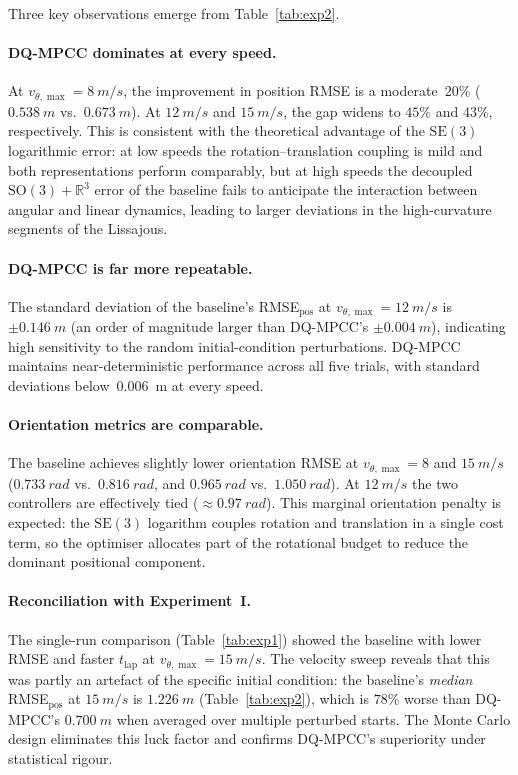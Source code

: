 Three key observations emerge from Table~\ref{tab:exp2}.

\paragraph{DQ-MPCC dominates at every speed.}
At $v_{\theta,\max} = \SI{8}{m/s}$, the improvement in position
RMSE is a moderate~$20\%$ ($\SI{0.538}{m}$ vs.\ $\SI{0.673}{m}$).
At $\SI{12}{m/s}$ and $\SI{15}{m/s}$, the gap widens to
$45\%$ and $43\%$, respectively.
This is consistent with the theoretical advantage of the
$\mathrm{SE}(3)$ logarithmic error: at low speeds the
rotation–translation coupling is mild and both representations
perform comparably, but at high speeds the decoupled
$\mathrm{SO}(3) + \mathbb{R}^3$ error of the baseline fails
to anticipate the interaction between angular and linear
dynamics, leading to larger deviations in the high-curvature
segments of the Lissajous.

\paragraph{DQ-MPCC is far more repeatable.}
The standard deviation of the baseline's RMSE$_{\text{pos}}$
at $v_{\theta,\max} = \SI{12}{m/s}$ is $\pm\SI{0.146}{m}$
(an order of magnitude larger than DQ-MPCC's
$\pm\SI{0.004}{m}$), indicating high sensitivity to the
random initial-condition perturbations.
DQ-MPCC maintains near-deterministic performance across all
five trials, with standard deviations below~\SI{0.006}{m}
at every speed.

\paragraph{Orientation metrics are comparable.}
The baseline achieves slightly lower orientation RMSE at
$v_{\theta,\max} = 8$ and $\SI{15}{m/s}$
($\SI{0.733}{rad}$ vs.\ $\SI{0.816}{rad}$, and
 $\SI{0.965}{rad}$ vs.\ $\SI{1.050}{rad}$).
At $\SI{12}{m/s}$ the two controllers are effectively tied
($\approx\!\SI{0.97}{rad}$).
This marginal orientation penalty is expected:
the $\mathrm{SE}(3)$ logarithm couples rotation and
translation in a single cost term, so the optimiser
allocates part of the rotational budget to reduce
the dominant positional component.

\paragraph{Reconciliation with Experiment~I.}
The single-run comparison (Table~\ref{tab:exp1}) showed
the baseline with lower RMSE and faster $t_{\text{lap}}$
at $v_{\theta,\max} = \SI{15}{m/s}$.
The velocity sweep reveals that this was partly an artefact
of the specific initial condition: the baseline's
\emph{median} RMSE$_{\text{pos}}$ at $\SI{15}{m/s}$
is $\SI{1.226}{m}$ (Table~\ref{tab:exp2}), which is
$78\%$ worse than DQ-MPCC's $\SI{0.700}{m}$ when averaged
over multiple perturbed starts.
The Monte Carlo design eliminates this luck factor and
confirms DQ-MPCC's superiority under statistical rigour.
